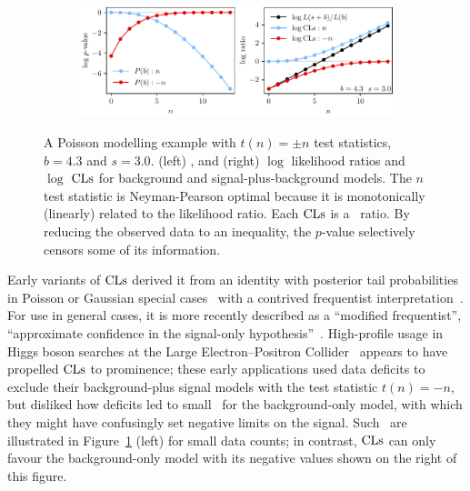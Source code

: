 \begin{figure}[tp]
\centering
\begin{subfigure}{\textwidth}
\centering
\includegraphics[width=\textwidth]{figures/searches_cls_plots_with_pvals_n.pdf}
\end{subfigure}
\caption[
A Poisson modelling example in the natural order.
]{%
A Poisson modelling example with $t(n) = \pm n$
test statistics, $b = 4.3$ and $s = 3.0$.
(left) \pvalues,
and (right) $\log$ likelihood ratios and $\log$ $\mathrm{CLs}$ for
background and signal-plus-background models.
The $n$ test statistic is Neyman-Pearson optimal because it is monotonically
(linearly) related to the likelihood ratio.
Each $\mathrm{CLs}$ is a \pvalue\ ratio.
By reducing the observed data to an inequality, the $p$-value selectively
censors some of its information.
}
\label{fig:searches_sb_n}
\end{figure}

Early variants of $\mathrm{CLs}$ derived it from an identity with posterior tail
probabilities in Poisson or Gaussian special cases~\cite{
Helene1983upper,
pdg1988,
read2000modified,
pdg2022ynf
}
with a contrived frequentist interpretation~\cite{zech1988cls}.
For use in general cases, it is more recently described as a
``modified frequentist'',
``approximate confidence in the signal-only hypothesis''~\cite{
read2000modified,
Read2002cls
}.
High-profile usage in Higgs boson searches at the
Large Electron–Positron Collider~\cite{
read1997optimal,
bock1998lower,
etde1998prospects,
junk1999confidence,
lep2000searches,
lep2003search
}
appears to have propelled $\mathrm{CLs}$ to prominence;
these early applications used data deficits to exclude their
background-plus signal models with the test statistic $t(n) = -n$, but
disliked how deficits led to small \pvalues\ for the background-only model,
with which they might have confusingly set negative limits on the signal.
Such \pvalues\ are illustrated in Figure~\ref{fig:searches_sb_n} (left)
for small data counts;
in contrast, $\mathrm{CLs}$ can only favour the background-only model with its negative
values shown on the right of this figure.

